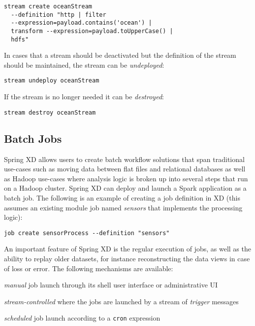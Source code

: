\begin{lstlisting}
stream create oceanStream
  --definition "http | filter
  --expression=payload.contains('ocean') |
  transform --expression=payload.toUpperCase() |
  hdfs"
\end{lstlisting}

In cases that a stream should be deactivated but the definition of the stream
should be maintained, the stream can be \emph{undeployed}:

\begin{lstlisting}
stream undeploy oceanStream
\end{lstlisting}

If the stream is no longer needed it can be \emph{destroyed}:

\begin{lstlisting}
stream destroy oceanStream
\end{lstlisting}

\subsection {Batch Jobs}

Spring XD allows users to create batch workflow solutions that span traditional
use-cases such as moving data between flat files and relational databases as
well as Hadoop use-cases where analysis logic is broken up into several steps
that run on a Hadoop cluster. Spring XD can deploy and launch a Spark application
as a batch job. The following is an example of creating a
job definition in XD (this assumes an existing module job named \emph{sensors} that
implements the processing logic):

\begin{lstlisting}
job create sensorProcess --definition "sensors"
\end{lstlisting}

An important feature of Spring XD is the regular
execution of jobs, as well as the ability to replay older datasets, for
instance reconstructing the data views in case of loss or error.
The following mechanisms are available:

\begin{itemize*}
\item \emph{manual} job launch through its shell user interface or
administrative UI
\item \emph{stream-controlled} where the jobs are launched by a stream of
\emph{trigger} messages
\item \emph{scheduled} job launch according to a \texttt{cron} expression
\end{itemize*}

